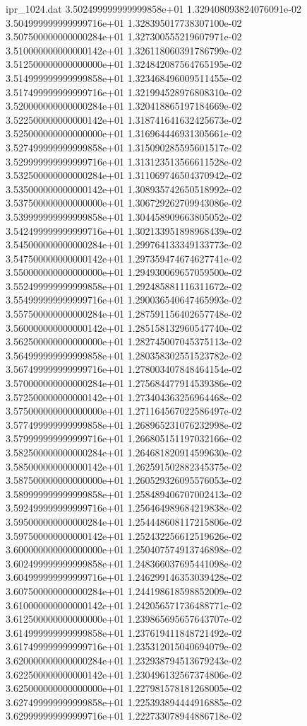 \begin{filecontents}{ipr_1024.dat}
3.502499999999999858e+01 1.329408093824076091e-02
3.504999999999999716e+01 1.328395017738307100e-02
3.507500000000000284e+01 1.327300555219607971e-02
3.510000000000000142e+01 1.326118060391786799e-02
3.512500000000000000e+01 1.324842087564765195e-02
3.514999999999999858e+01 1.323468496009511455e-02
3.517499999999999716e+01 1.321994528976808310e-02
3.520000000000000284e+01 1.320418865197184669e-02
3.522500000000000142e+01 1.318741641632425673e-02
3.525000000000000000e+01 1.316964446931305661e-02
3.527499999999999858e+01 1.315090285595601517e-02
3.529999999999999716e+01 1.313123513566611528e-02
3.532500000000000284e+01 1.311069746504370942e-02
3.535000000000000142e+01 1.308935742650518992e-02
3.537500000000000000e+01 1.306729262709943086e-02
3.539999999999999858e+01 1.304458909663805052e-02
3.542499999999999716e+01 1.302133951898968439e-02
3.545000000000000284e+01 1.299764133349133773e-02
3.547500000000000142e+01 1.297359474674627741e-02
3.550000000000000000e+01 1.294930069657059500e-02
3.552499999999999858e+01 1.292485881116311672e-02
3.554999999999999716e+01 1.290036540647465993e-02
3.557500000000000284e+01 1.287591156402657748e-02
3.560000000000000142e+01 1.285158132960547740e-02
3.562500000000000000e+01 1.282745007045375113e-02
3.564999999999999858e+01 1.280358302551523782e-02
3.567499999999999716e+01 1.278003407848464154e-02
3.570000000000000284e+01 1.275684477914539386e-02
3.572500000000000142e+01 1.273404363256964468e-02
3.575000000000000000e+01 1.271164567022586497e-02
3.577499999999999858e+01 1.268965231076232998e-02
3.579999999999999716e+01 1.266805151197032166e-02
3.582500000000000284e+01 1.264681820914599630e-02
3.585000000000000142e+01 1.262591502882345375e-02
3.587500000000000000e+01 1.260529326095576053e-02
3.589999999999999858e+01 1.258489406707002413e-02
3.592499999999999716e+01 1.256464989684219838e-02
3.595000000000000284e+01 1.254448608117215806e-02
3.597500000000000142e+01 1.252432256612519626e-02
3.600000000000000000e+01 1.250407574913746898e-02
3.602499999999999858e+01 1.248366037695441098e-02
3.604999999999999716e+01 1.246299146353039428e-02
3.607500000000000284e+01 1.244198618598852009e-02
3.610000000000000142e+01 1.242056571736488771e-02
3.612500000000000000e+01 1.239865695657643707e-02
3.614999999999999858e+01 1.237619411848721492e-02
3.617499999999999716e+01 1.235312015040694079e-02
3.620000000000000284e+01 1.232938794513679243e-02
3.622500000000000142e+01 1.230496132567374806e-02
3.625000000000000000e+01 1.227981578181268005e-02
3.627499999999999858e+01 1.225393894444916885e-02
3.629999999999999716e+01 1.222733078944886718e-02

\end{filecontents}
